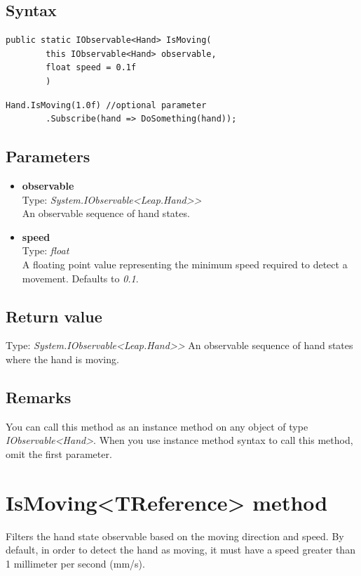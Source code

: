 \documentclass[12pt,a4paper,twoside]{report}
\begin{document}
\subsection{Syntax}
\begin{lstlisting}[caption=Declaration]
    public static IObservable<Hand> IsMoving(
        this IObservable<Hand> observable,
        float speed = 0.1f
        )
\end{lstlisting}

\begin{lstlisting}[caption=Usage example]
    Hand.IsMoving(1.0f) //optional parameter
        .Subscribe(hand => DoSomething(hand));
\end{lstlisting}

\subsection{Parameters}

\begin{itemize}
    \item \textbf{observable}\\
        Type: \textit{System.IObservable<Leap.Hand>{}>}\\
        An observable sequence of hand states.
    \item \textbf{speed}\\
        Type: \textit{float}\\
        A floating point value representing the minimum speed required to detect a movement. Defaults to
        \textit{0.1}.
\end{itemize}

\subsection{Return value}
Type: \textit{System.IObservable<Leap.Hand>{}>}
An observable sequence of hand states where the hand is moving.

\subsection{Remarks}
You can call this method as an instance method on any object of type \textit{IObservable<Hand>}. When you use instance method syntax to call this method, omit the first parameter.

\section{IsMoving<TReference> method}
Filters the hand state observable based on the moving direction and speed. By default, in order to detect the hand as moving, it must have a speed greater than 1 millimeter per second (mm/s).
\end{document}
